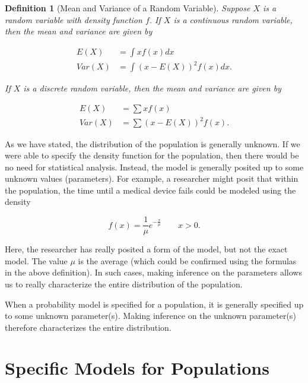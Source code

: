 \documentclass[
]{book}
\theoremstyle{plain}
\theoremstyle{mydefn}
\newtheorem{definition}{Definition}[chapter]
\theoremstyle{myexmpl}
\theoremstyle{remark}
\begin{document}
\begin{definition}[Mean and Variance of a Random Variable]
Suppose \(X\) is a random variable with density function \(f\). If \(X\) is a continuous random variable, then the mean and variance are given by

\[
\begin{aligned}
  E(X) &= \int x f(x) dx \\
  Var(X) &= \int \left(x - E(X)\right)^2 f(x) dx.
\end{aligned}
\]

If \(X\) is a discrete random variable, then the mean and variance are given by

\[
\begin{aligned}
  E(X) &= \sum x f(x) \\
  Var(X) &= \sum \left(x - E(X)\right)^2 f(x).
\end{aligned}
\]
\end{definition}

As we have stated, the distribution of the population is generally unknown. If we were able to specify the density function for the population, then there would be no need for statistical analysis. Instead, the model is generally posited up to some unknown values (parameters). For example, a researcher might posit that within the population, the time until a medical device fails could be modeled using the density

\[f(x) = \frac{1}{\mu} e^{-\frac{x}{\mu}} \qquad x > 0.\]

Here, the researcher has really posited a form of the model, but not the exact model. The value \(\mu\) is the average (which could be confirmed using the formulas in the above definition). In such cases, making inference on the parameters allows us to really characterize the entire distribution of the population.

\begin{rmdkeyidea}
When a probability model is specified for a population, it is generally specified up to some unknown parameter(s). Making inference on the unknown parameter(s) therefore characterizes the entire distribution.
\end{rmdkeyidea}

\hypertarget{specific-models-for-populations}{%
\section{Specific Models for Populations}\label{specific-models-for-populations}}
\end{document}
